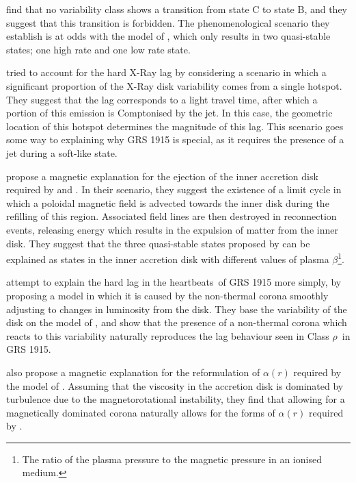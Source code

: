 \citeauthor{Belloni_GRS_MI} find that no variability class shows a transition from state C to state B, and they suggest that this transition is forbidden.  The phenomenological scenario they establish is at odds with the model of \citet{Nayakshin_GRSModel}, which only results in two quasi-stable states; one high rate and one low rate state.
\par \citet{Nobili_Hotspot} tried to account for the hard X-Ray lag by considering a scenario in which a significant proportion of the X-Ray disk variability comes from a single hotspot.  They suggest that the lag corresponds to a light travel time, after which a portion of this emission is Comptonised by the jet.  In this case, the geometric location of this hotspot determines the magnitude of this lag.  This scenario goes some way to explaining why GRS 1915 is special, as it requires the presence of a jet during a soft-like state.
\par \citet{Tagger_MagneticFlood} propose a magnetic explanation for the ejection of the inner accretion disk required by \citet{Nayakshin_GRSModel} and \citet{Janiuk_RadInstab}.  In their scenario, they suggest the existence of a limit cycle in which a poloidal magnetic field is advected towards the inner disk during the refilling of this region.  Associated field lines are then destroyed in reconnection events, releasing energy which results in the expulsion of matter from the inner disk.  They suggest that the three quasi-stable states proposed by \citealp{Belloni_GRS_MI} can be explained as states in the inner accretion disk with different values of plasma $\beta$\footnote{The ratio of the plasma pressure to the magnetic pressure in an ionised medium.}.
\par \citealp{Janiuk_Lag} attempt to explain the hard lag in the heartbeats\indexrho\ of GRS 1915 more simply, by proposing a model in which it is caused by the non-thermal corona smoothly adjusting to changes in luminosity from the disk.  They base the variability of the disk on the model of \citealp{Nayakshin_GRSModel}, and show that the presence of a non-thermal corona which reacts to this variability naturally reproduces the lag behaviour seen in Class $\rho$\indexrho\ in GRS 1915.
\par \citealp{Merloni_MagDom} also propose a magnetic explanation for the reformulation of $\alpha(r)$ required by the model of \citealp{Nayakshin_GRSModel}.  Assuming that the viscosity in the accretion disk is dominated by turbulence due to the magnetorotational instability, they find that allowing for a magnetically dominated corona naturally allows for the forms of $\alpha(r)$ required by \citealp{Nayakshin_GRSModel}.
